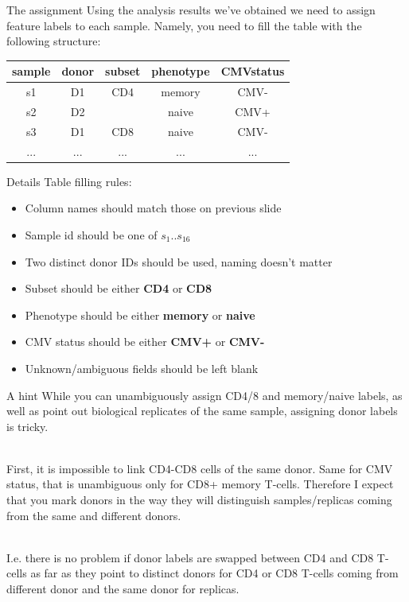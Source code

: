 \documentclass[12pt]{beamer}
\begin{document}
\begin{frame}{The assignment}
Using the analysis results we've obtained we need to assign feature labels to each sample. Namely, you need to fill the table with the following structure:
\begin{table}[h!]
  \begin{center}
    \begin{tabular}{c|c|c|c|c}
      \textbf{sample} & \textbf{donor} & \textbf{subset} & \textbf{phenotype} & \textbf{CMVstatus} \\
      \hline
      s1 & D1 & CD4 & memory & CMV- \\
      s2 & D2 &   & naive & CMV+ \\
      s3 & D1 & CD8 & naive & CMV- \\
      ... & ... & ... & ... & ... \\
    \end{tabular}
  \end{center}
\end{table}
\end{frame}

\begin{frame}{Details}
Table filling rules:
\begin{itemize}
\item Column names should match those on previous slide
\item Sample id should be one of $s_1..s_{16}$
\item Two distinct donor IDs should be used, naming doesn't matter
\item Subset should be either \textbf{CD4} or \textbf{CD8}
\item Phenotype should be either \textbf{memory} or \textbf{naive}
\item CMV status should be either \textbf{CMV+} or \textbf{CMV-}
\item Unknown/ambiguous fields should be left blank
\end{itemize}
\end{frame}

\begin{frame}{A hint}
While you can unambiguously assign CD4/8 and memory/naive labels, as well as point out biological replicates of the same sample, assigning donor labels is tricky.\\~\

First, it is impossible to link CD4-CD8 cells of the same donor. Same for CMV status, that is unambiguous only for CD8+ memory T-cells. Therefore I expect that you mark donors in the way they will distinguish samples/replicas coming from the same and different donors.\\~\

I.e. there is no problem if donor labels are swapped between CD4 and CD8 T-cells as far as they point to distinct donors for CD4 or CD8 T-cells coming from different donor and the same donor for replicas.
\end{frame}
\end{document}

